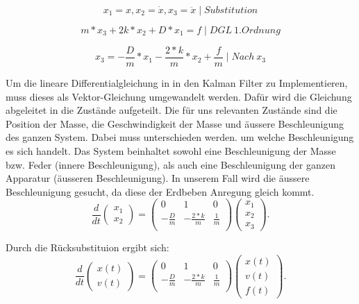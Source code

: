 \documentclass[11pt,a4paper]{article}
\begin{document}
\begin{equation}
{x_1}=x, 
{x_2}=\dot x, 
{x_3}=\ddot x \mid Substitution
\end{equation}


\begin{equation}
m* {x_3}+ 2k*{x_2} + D*{x_1} = f \mid DGL  \:1. Ordnung
\end{equation} 

\begin{equation}
{x_3}=-\frac{D}{m} *{x_1} -\frac{2*k}{m} *{x_2} + \frac{f} {m}  \mid  Nach  \: {x_3} 
\end{equation} 

Um die lineare Differentialgleichung in in den Kalman Filter zu Implementieren, muss dieses als Vektor-Gleichung umgewandelt werden. Dafür wird die Gleichung abgeleitet in die Zustände aufgeteilt. Die für uns relevanten Zustände sind die Position der Masse, die Geschwindigkeit der Masse und äussere Beschleunigung des ganzen System. Dabei muss unterschieden werden. um welche Beschleunigung es sich handelt. Das System beinhaltet sowohl eine Beschleunigung der Masse bzw. Feder (innere Beschleunigung), als auch eine Beschleunigung der ganzen Apparatur (äusseren Beschleunigung). In unserem Fall wird die äussere Beschleunigung gesucht, da diese der Erdbeben Anregung gleich kommt. 
\begin{equation}
\frac{d}{dt} \left(\begin{array}{c} {x_1} \\ {x_2}  \end{array}\right) = \left(
 \begin{array}{ccc} 	
0 & 1& 0 \\ 
- \frac{D}{m} &-\frac{2*k}{m} & \frac{1} {m}\\
\end{array}\right)  \left(\begin{array}{c} {x_1} \\ {x_2} \\ {x_3} \end{array}\right).
\end{equation}

Durch die Rücksubstituion ergibt sich:
\begin{equation}
\frac{d}{dt} \left(\begin{array}{c} x(t) \\ v(t) \end{array}\right) = \left(
 \begin{array}{ccc} 	
0 & 1& 0 \\ 
- \frac{D}{m} &-\frac{2*k}{m} & \frac{1} {m}\\
\end{array}\right)  \left(\begin{array}{c} x(t)\\ v(t)\\ f(t) \end{array}\right).
\end{equation}
\end{document}
